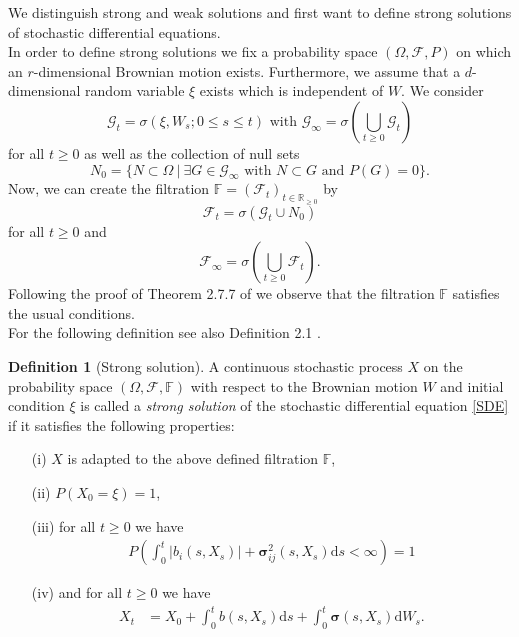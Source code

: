 \documentclass[11pt,titlepage]{article}
\newcommand{\R}{\mathbb{R}} %
\newcommand{\abs}[1]{{\left| #1 \right|}}
\theoremstyle{definition}
\newtheorem{definition}[theorem]{Definition}
\theoremstyle{remark}
\begin{document}
	We distinguish strong and weak solutions and first want to define strong solutions of stochastic differential equations. \\
	In order to define strong solutions we fix a probability space $(\Omega, \mathcal{F}, P)$ on which an $r$-dimensional Brownian motion exists. Furthermore, we assume that a $d$-dimensional 
	random variable $\xi$ exists which is independent of $W$. 
	We consider
	\[\mathcal{G}_t = \sigma(\xi, W_s; 0\leq s\leq t) \text{ with } \mathcal{G}_\infty = \sigma\left(\bigcup_{t\geq 0}\mathcal{G}_t\right)\]
	for all $t\geq 0$ as well as the collection of null sets
	\[N_0 = \{ N \subset \Omega\ \vert\ \exists G\in \mathcal{G}_\infty \text{ with } N\subset G\text{ and } P(G)=0\}.\]
	Now, we can create the filtration $\mathbb{F} = (\mathcal{F}_t)_{t\in\R_{\geq 0}}$ by
	\[\mathcal{F}_t = \sigma(\mathcal{G}_t \cup N_0)\]
	for all $t\geq 0$ and
	\[\mathcal{F}_\infty = \sigma\left(\bigcup_{t\geq 0}\mathcal{F}_t\right).\]
	Following the proof of Theorem 2.7.7 of \cite{Karatzas2012} we observe that the filtration $\mathbb{F}$ 
	satisfies the usual conditions. \\
	For the following definition see also Definition 2.1 \cite{Karatzas2012}.
	
	\begin{definition}[Strong solution] \label{SDE strong solution}
		A continuous stochastic process $X$ on the probability space $(\Omega, \mathcal{F},\mathbb{F})$ 
		with respect to the Brownian motion $W$ and initial condition $\xi$ is called a \textsl{strong solution}
		of the stochastic differential equation \ref{SDE} if it satisfies the following properties:
		\begin{itemize}
			\item[(i)] $X$ is adapted to the above defined filtration $\mathbb{F}$,
			\item[(ii)] $P(X_0 = \xi)=1$, 
			\item[(iii)] for all $t\geq 0$ we have
			\begin{align*}
				P\left(\int_0^t \abs{b_i(s, X_s)} +\boldsymbol{\sigma}_{ij}^2(s, X_s) \mathrm{d}s<\infty\right)=1
			\end{align*}
			\item[(iv)] and for all $t\geq 0$ we have
			\begin{align*}
				X_t &= X_0 + \int_0^t b(s, X_s)\mathrm{d}s + \int_0^t \boldsymbol{\sigma}(s,X_s)\mathrm{d}W_s.
			\end{align*}
		\end{itemize}
	\end{definition} 
\end{document}
